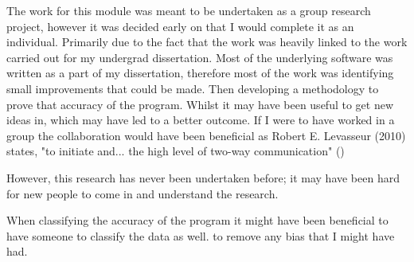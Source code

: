 The work for this module was meant to be undertaken as a group research project, however it was decided early on that I would complete it as an individual. Primarily due to the fact that the work was heavily linked to the work carried out for my undergrad dissertation. Most of the underlying software was written as a part of my dissertation, therefore most of the work was identifying small improvements that could be made. Then developing a methodology to prove that accuracy of the program. Whilst it may have been useful to get new ideas in, which may have led to a better outcome. If I were to have worked in a group the collaboration would have been beneficial as Robert E. Levasseur (2010) states, "to initiate and... the high level of two-way communication" (\cite{levasseur2010people})

 However, this research has never been undertaken before; it may have been hard for new people to come in and understand the research.

When classifying the accuracy of the program it might have been beneficial to have someone to classify the data as well. to remove any bias that I might have had. 